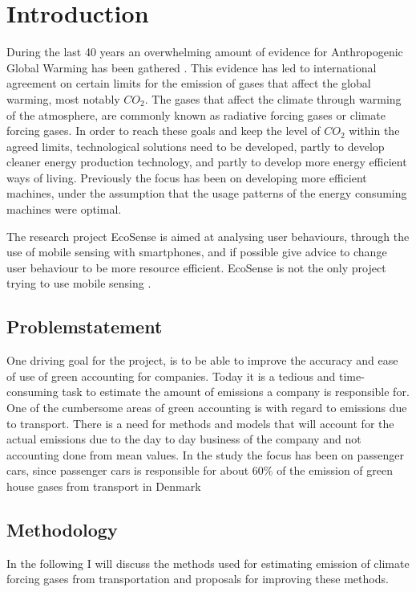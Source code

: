 \section{Introduction}
During the last 40 years an overwhelming amount of evidence for Anthropogenic Global Warming has been gathered \cite{schipper2008earthscan}. This evidence has led to international agreement on certain limits for the emission of gases that affect the global warming, most notably $CO_2$.  The gases that affect the climate through warming of the atmosphere, are commonly known as radiative forcing gases or climate forcing gases. In order to reach these goals and keep the level of $CO_2$ within the agreed limits, technological solutions need to be developed, partly to develop cleaner energy production technology, and partly to develop more energy efficient ways of living. Previously the focus has been on developing more efficient machines, under the assumption that the usage patterns of the energy consuming machines were optimal.

The research project EcoSense is aimed at analysing user behaviours, through the use of mobile sensing with smartphones, and if possible give advice to change user behaviour to be more resource efficient.
EcoSense is not the only project trying to use mobile sensing \cite{mun_peir_2009} \cite{calabrese1977}.

\subsection{Problemstatement}
One driving goal for the project, is to be able to improve the accuracy and ease of use of green accounting for companies. Today it is a tedious and time-consuming task to estimate the amount of emissions a company is responsible for. One of the cumbersome areas of green accounting is with regard to emissions due to transport. There is a need for methods and models that will account for the actual emissions due to the day to day business of the company and not accounting done from mean values. In the study the focus has been on passenger cars, since passenger cars is responsible for about 60\% of the emission of green house gases from transport in Denmark \cite{nielsen2014} 


\subsection{Methodology}
In the following I will discuss the methods used for estimating emission of climate forcing gases from transportation and proposals for improving these methods.

